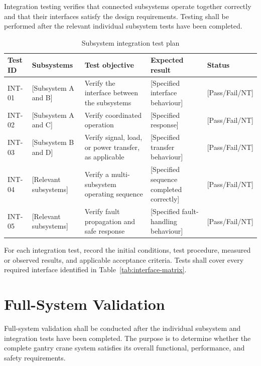 Integration testing verifies that connected subsystems operate
together correctly and that their interfaces satisfy the design
requirements. Testing shall be performed after the relevant
individual subsystem tests have been completed.

\begin{table}[htbp]
    \centering
    \caption{Subsystem integration test plan}
    \label{tab:integration-tests}
    \renewcommand{\arraystretch}{1.4}
    \begin{tabularx}{\textwidth}{|l|X|X|X|X|}
        \hline
        \textbf{Test ID} &
        \textbf{Subsystems} &
        \textbf{Test objective} &
        \textbf{Expected result} &
        \textbf{Status} \\
        \hline
        INT-01 & [Subsystem A and B] &
        Verify the interface between the subsystems &
        [Specified interface behaviour] &
        [Pass/Fail/NT] \\
        \hline
        INT-02 & [Subsystem A and C] &
        Verify coordinated operation &
        [Specified response] &
        [Pass/Fail/NT] \\
        \hline
        INT-03 & [Subsystem B and D] &
        Verify signal, load, or power transfer, as applicable &
        [Specified transfer behaviour] &
        [Pass/Fail/NT] \\
        \hline
        INT-04 & [Relevant subsystems] &
        Verify a multi-subsystem operating sequence &
        [Specified sequence completed correctly] &
        [Pass/Fail/NT] \\
        \hline
        INT-05 & [Relevant subsystems] &
        Verify fault propagation and safe response &
        [Specified fault-handling behaviour] &
        [Pass/Fail/NT] \\
        \hline
    \end{tabularx}
\end{table}

For each integration test, record the initial conditions, test
procedure, measured or observed results, and applicable
acceptance criteria. Tests shall cover every required interface
identified in Table~\ref{tab:interface-matrix}.


\section{Full-System Validation}
\label{sec:system-validation}

Full-system validation shall be conducted after the individual
subsystem and integration tests have been completed. The purpose
is to determine whether the complete gantry crane system satisfies
its overall functional, performance, and safety requirements.


